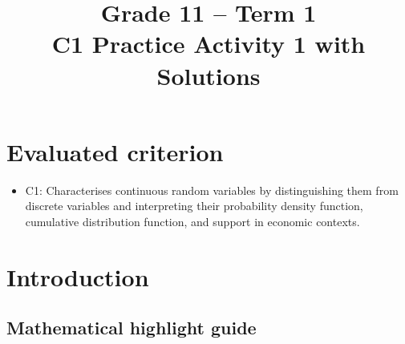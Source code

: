 \makeatletter
{}
\makeatother




\COneTonePracticePalette





\title{Grade 11 -- Term 1 \\ C1 Practice Activity 1 with Solutions}
\author{}
\date{}


	\maketitle

	\setcounter{tocdepth}{1}
	\setcounter{secnumdepth}{2}
	\label{toc}
	\tableofcontents

	\section*{Evaluated criterion}
	\begin{itemize}
		\item C1: Characterises continuous random variables by distinguishing them from discrete variables and interpreting their probability density function, cumulative distribution function, and support in economic contexts.
	\end{itemize}


	\section{Introduction}
	\label{sec:introduction}
\subsection*{Mathematical highlight guide}
\label{tone:C1:legend}


